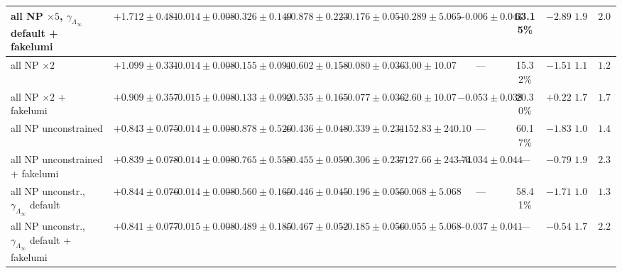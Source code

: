 \documentclass[landscape]{article}
\begin{document}
\begin{table}[h]
{\begin{tabular}{lccccccccrrr}
    all NP $\times 5$, $\gamma_{\Lambda_\infty}$ default + fakelumi & $+1.712\pm0.481$ & $-0.014\pm0.008$ & $-0.326\pm0.149$ & $+0.878\pm0.223$ & $-0.176\pm0.051$ & $-0.289\pm5.065$ & $-0.006\pm0.041$ & 63.15\% & $-2.89$ & $1.987$ & $2.085$ \\
    \hline
    all NP $\times 2$ & $+1.099\pm0.331$ & $-0.014\pm0.008$ & $-0.155\pm0.091$ & $+0.602\pm0.158$ & $-0.080\pm0.036$ & $-3.00\pm10.07$ & --- & 15.32\% & $-1.51$ & $1.196$ & $1.204$ \\
    all NP $\times 2$ + fakelumi & $+0.909\pm0.357$ & $-0.015\pm0.008$ & $-0.133\pm0.092$ & $+0.535\pm0.165$ & $-0.077\pm0.036$ & $-2.60\pm10.07$ & $-0.053\pm0.038$ & 20.30\% & $+0.22$ & $1.726$ & $1.777$ \\
    \hline
    all NP unconstrained & $+0.843\pm0.075$ & $-0.014\pm0.008$ & $-0.878\pm0.526$ & $+0.436\pm0.048$ & $-0.339\pm0.231$ & $+152.83\pm240.10$ & --- & 60.17\% & $-1.83$ & $1.068$ & $1.465$ \\
    all NP unconstrained + fakelumi & $+0.839\pm0.078$ & $-0.014\pm0.008$ & $-0.765\pm0.558$ & $+0.455\pm0.059$ & $-0.306\pm0.237$ & $+127.66\pm243.74$ & $-0.034\pm0.044$ & --- & $-0.79$ & $1.937$ & $2.331$ \\
    \hline
    all NP unconstr., $\gamma_{\Lambda_\infty}$ default & $+0.844\pm0.076$ & $-0.014\pm0.008$ & $-0.560\pm0.165$ & $+0.446\pm0.045$ & $-0.196\pm0.055$ & $+0.068\pm5.068$ & --- & 58.41\% & $-1.71$ & $1.053$ & $1.365$ \\
    all NP unconstr., $\gamma_{\Lambda_\infty}$ default + fakelumi & $+0.841\pm0.077$ & $-0.015\pm0.008$ & $-0.489\pm0.185$ & $+0.467\pm0.052$ & $-0.185\pm0.056$ & $+0.055\pm5.068$ & $-0.037\pm0.041$ & --- & $-0.54$ & $1.737$ & $2.212$ \\
    \hline\hline
  \end{tabular}%
  }
\end{table}
\end{document}
